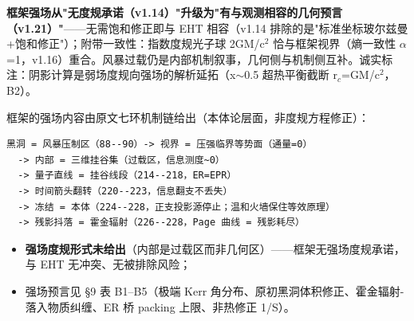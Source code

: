 \documentclass[12pt]{article}
\newcommand{\up}[1]{\ensuremath{^{#1}}}
\newcommand{\down}[1]{\ensuremath{_{#1}}}
\begin{document}
\textbf{框架强场从"无度规承诺（v1.14）"升级为"有与观测相容的几何预言（v1.21）"}------无需饱和修正即与 EHT 相容（v1.14 排除的是"标准坐标玻尔兹曼+饱和修正"）；附带一致性：指数度规光子球 2GM/c\up{2} 恰与框架视界（熵一致性 \ensuremath{\alpha}=1，v1.16）重合。风暴过载仍是内部机制叙事，几何侧与机制侧互补。诚实标注：阴影计算是弱场度规向强场的解析延拓（x\ensuremath{\sim}0.5 超热平衡截断 r\down{c}=GM/c\up{2}，B2）。

框架的强场内容由原文七环机制链给出（本体论层面，非度规方程修正）：

\begin{verbatim}
黑洞 = 风暴压制区（88--90）-> 视界 = 压强临界等势面（通量=0）
  -> 内部 = 三维挂谷集（过载区，信息测度~0）
  -> 量子直线 = 挂谷线段（214--218，ER=EPR）
  -> 时间箭头翻转（220--223，信息翻支不丢失）
  -> 冻结 = 本体（224--228，正支投影源停止；温和火墙保住等效原理）
  -> 残影抖落 = 霍金辐射（226--228，Page 曲线 = 残影耗尽）
\end{verbatim}

\begin{itemize}
\item \textbf{强场度规形式未给出}（内部是过载区而非几何区）------框架无强场度规承诺，与 EHT 无冲突、无被排除风险；
\item 强场预言见 \S{}9 表 B1--B5（极端 Kerr 角分布、原初黑洞体积修正、霍金辐射-落入物质纠缠、ER 桥 packing 上限、非热修正 1/S）。
\end{itemize}
\end{document}
